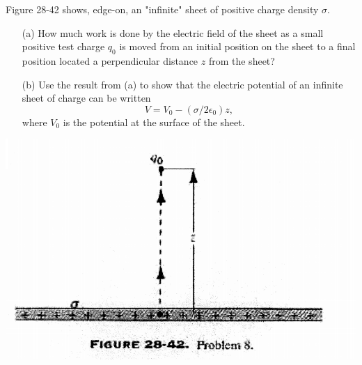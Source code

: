 \documentclass[12pt,letterpaper,boxed,cm]{hmcpset}
\newcommand{\pn}[1]{\left( #1 \right)}
\begin{document}

\begin{problem}[28-P8]	
Figure 28-42 shows, edge-on, an "infinite" sheet of positive charge density $\sigma$.
\begin{enumerate}
	\item[(a)] How much work is done by the electric field of the sheet as a small positive test charge $q_0$ is moved from an initial position on the sheet to a final position located a perpendicular distance $z$ from the sheet?
	\item[(b)] Use the result from (a) to show that the electric potential of an infinite sheet of charge can be written
	\[
		V = V_0 - \pn{\sigma/2\epsilon_0}z,
	\]
	where $V_0$ is the potential at the surface of the sheet.
\end{enumerate}
\begin{center}
	\includegraphics[scale=0.7]{01.png}
\end{center}
\end{problem}
\begin{solution}
\end{solution}
\newpage
\end{document}
